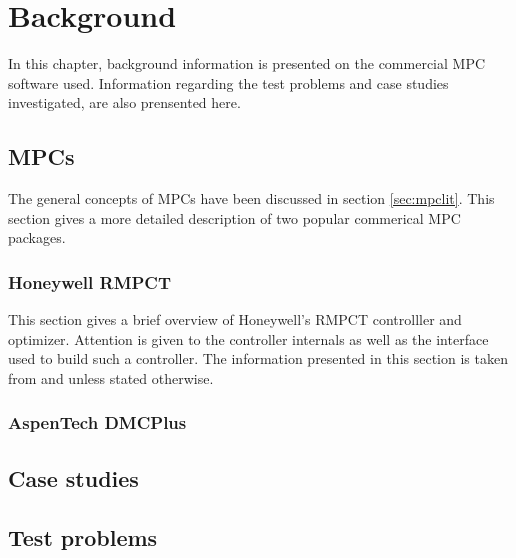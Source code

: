 \chapter{Background}\label{chap:background}
\begin{overview}
  In this chapter, background information is presented on the commercial
  MPC software used. Information regarding the test problems and case studies
  investigated, are also prensented here.
\end{overview}

\section{MPCs}
The general concepts of MPCs have been discussed in section \ref{sec:mpclit}.
This section gives a more detailed description of two popular commerical MPC
packages.
\subsection{Honeywell RMPCT}
This section gives a brief overview of Honeywell's RMPCT controlller and
optimizer. Attention is given to the controller internals as well as the
interface used to build such a controller. The information presented in this
section is taken from \citet{honeywell1} and \citet{honeywell2} unless stated 
otherwise.
\subsection{AspenTech DMCPlus}

\section{Case studies}

\section{Test problems}

